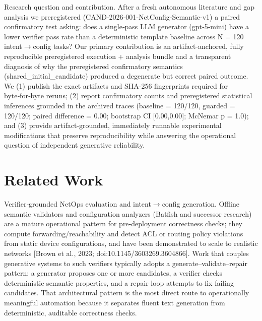 \documentclass[conference]{IEEEtran}
\begin{document}
Research question and contribution. After a fresh autonomous literature and gap analysis we preregistered (CAND‑2026‑001‑NetConfig‑Semantic‑v1) a paired confirmatory test asking: does a single‑pass LLM generator (gpt‑5‑mini) have a lower verifier pass rate than a deterministic template baseline across N = 120 intent\ensuremath{\rightarrow}config tasks? Our primary contribution is an artifact‑anchored, fully reproducible preregistered execution + analysis bundle and a transparent diagnosis of why the preregistered confirmatory semantics (shared\_initial\_candidate) produced a degenerate but correct paired outcome. We (1) publish the exact artifacts and SHA‑256 fingerprints required for byte‑for‑byte reruns; (2) report confirmatory counts and preregistered statistical inferences grounded in the archived traces (baseline = 120/120, guarded = 120/120; paired difference = 0.00; bootstrap CI [0.00,0.00]; McNemar p = 1.0); and (3) provide artifact‑grounded, immediately runnable experimental modifications that preserve reproducibility while answering the operational question of independent generative reliability.

\section{Related Work}
Verifier‑grounded NetOps evaluation and intent\ensuremath{\rightarrow}config generation. Offline semantic validators and configuration analyzers (Batfish and successor research) are a mature operational pattern for pre‑deployment correctness checks; they compute forwarding/reachability and detect ACL or routing policy violations from static device configurations, and have been demonstrated to scale to realistic networks [Brown et al., 2023; doi:10.1145/3603269.3604866]. Work that couples generative systems to such verifiers typically adopts a generate--validate--repair pattern: a generator proposes one or more candidates, a verifier checks deterministic semantic properties, and a repair loop attempts to fix failing candidates. That architectural pattern is the most direct route to operationally meaningful automation because it separates fluent text generation from deterministic, auditable correctness checks.
\end{document}

